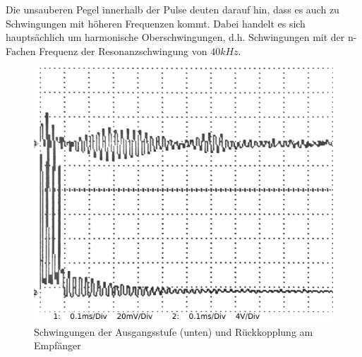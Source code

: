 Die unsauberen Pegel innerhalb der Pulse deuten darauf hin, dass es auch zu Schwingungen mit höheren Frequenzen kommt. Dabei handelt es sich hauptsächlich um harmonische Oberschwingungen, d.h. Schwingungen mit der n-Fachen Frequenz der Resonanzschwingung von $40 kHz$. %
\begin{figure}[H]
\centering
\includegraphics[width=(\textwidth), angle=0]{oszi/15-04-23/2_01.png} %
\caption{Schwingungen der Ausgangsstufe (unten) und Rückkopplung am Empfänger} \label{img:I6}
\end{figure}

